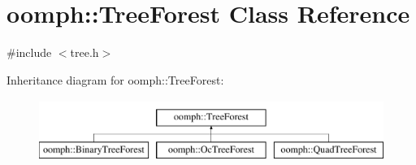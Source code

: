 \hypertarget{classoomph_1_1TreeForest}{}\section{oomph\+:\+:Tree\+Forest Class Reference}
\label{classoomph_1_1TreeForest}


{\ttfamily \#include $<$tree.\+h$>$}

Inheritance diagram for oomph\+:\+:Tree\+Forest\+:\begin{figure}[H]
\begin{center}
\leavevmode
\includegraphics[height=2.000000cm]{classoomph_1_1TreeForest}
\end{center}
\end{figure}
